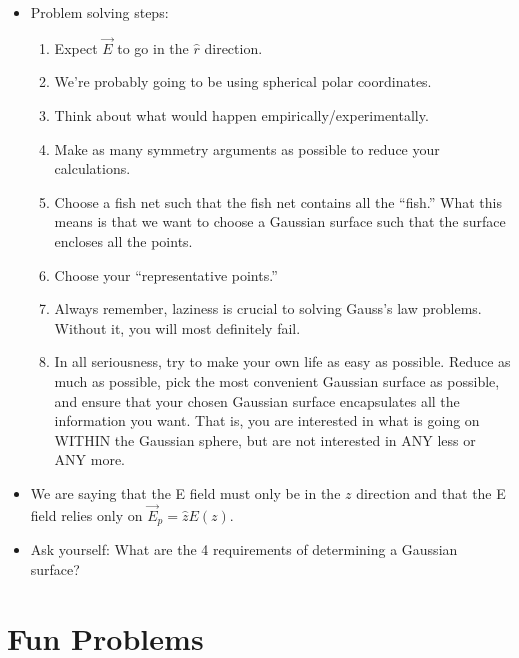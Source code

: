 \documentclass[12pt]{extreport}
\begin{document}
\begin{itemize}
		\item Problem solving steps:
		\begin{enumerate}
			\item Expect $\vec E$ to go in the $\hat r$ direction.
			\item We're probably going to be using spherical polar coordinates.
			\item Think about what would happen empirically/experimentally.
			\item Make as many symmetry arguments as possible to reduce your calculations.
			\item Choose a fish net such that the fish net contains all the ``fish.'' What this means is that we want to choose a Gaussian surface such that the surface encloses all the points.
			\item Choose your ``representative points.''
			\item Always remember, laziness is crucial to solving Gauss's law problems. Without it, you will most definitely fail.
			\item In all seriousness, try to make your own life as easy as possible. Reduce as much as possible, pick the most convenient Gaussian surface as possible, and ensure that your chosen Gaussian surface encapsulates all the information you want. That is, you are interested in what is going on WITHIN the Gaussian sphere, but are not interested in ANY less or ANY more.
		\end{enumerate}

		\item We are saying that the E field must only be in the $z$ direction and that the E field relies only on $\vec E_p = \hat z E(z).$

		\item Ask yourself: What are the 4 requirements of determining a Gaussian surface?
	\end{itemize}


\chapter{Fun Problems}
\end{document}

